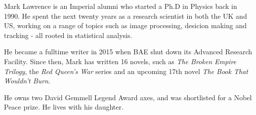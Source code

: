 Mark Lawrence is an Imperial alumni who started a Ph.D in Physics back in 1990. He spent the next twenty years as a research scientist in both the UK and US, working on a range of topics such as image processing, desicion making and tracking - all rooted in statistical analysis.

He became a fulltime writer in 2015 when BAE shut down its Advanced Research Facility. Since then, Mark has written 16 novels, such as \emph{The Broken Empire Trilogy}, the \emph{Red Queen's War} series and an upcoming 17th novel \emph{The Book That Wouldn't Burn}.

He owns two David Gemmell Legend Award axes, and was shortlisted for a Nobel Peace prize. He lives with his daughter.